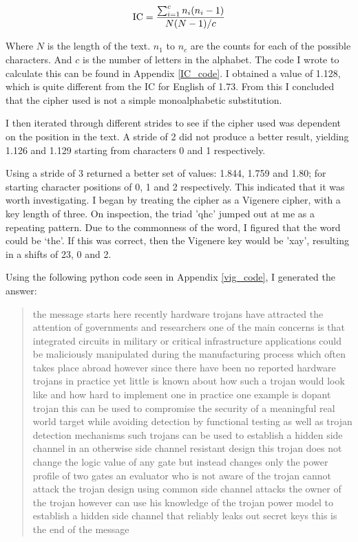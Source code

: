 \documentclass[11pt,a4paper,twoside]{article}
\begin{document}
$$
\textup{IC} =  \frac{\sum_{i=1}^{c} n_i(n_i -1)}{N(N - 1)/c}
$$

Where $N$ is the length of the text. $n_1$ to $n_c$ are the counts for each of
the possible characters. And $c$ is the number of letters in the alphabet. The
code I wrote to calculate this can be found in Appendix \ref{IC_code}. I
obtained a value of 1.128, which is quite different from the IC for English of
1.73. From this I concluded that the cipher used is not a simple monoalphabetic
substitution. 

I then iterated through different strides to see if the cipher used was
dependent on the position in the text. A stride of 2 did not produce a better
result, yielding 1.126 and 1.129 starting from characters 0 and 1 respectively.  

Using a stride of 3 returned a better set of values: 1.844, 1.759 and 1.80; for
starting character positions of 0, 1 and 2 respectively. This indicated that it
was worth investigating. I began by treating the cipher as a Vigenere cipher,
with a key length of three. On inspection, the triad 'qhc' jumped out at me as
a repeating pattern. Due to the commonness of the word, I figured that the
word could be `the'. If this was correct, then the Vigenere key would be 'xay',
resulting in a shifts of 23, 0 and 2.

Using the following python code seen in Appendix \ref{vig_code}, I generated
the answer: 

\begin{quote}
\small
\raggedright
the message starts here recently hardware trojans have attracted the attention
of governments and researchers one of the main concerns is that integrated
circuits in military or critical infrastructure applications could be
maliciously manipulated during the manufacturing process which often takes
place abroad however since there have been no reported hardware trojans in
practice yet little is known about how such a trojan would look like and how
hard to implement one in practice one example is dopant trojan this can be used
to compromise the security of a meaningful real world target while avoiding
detection by functional testing as well as trojan detection mechanisms such
trojans can be used to establish a hidden side channel in an otherwise side
channel resistant design this trojan does not change the logic value of any
gate but instead changes only the power profile of two gates an evaluator who
is not aware of the trojan cannot attack the trojan design using common side
channel attacks the owner of the trojan however can use his knowledge of the
trojan power model to establish a hidden side channel that reliably leaks out
secret keys this is the end of the message
\end{quote}
 
\end{document}
